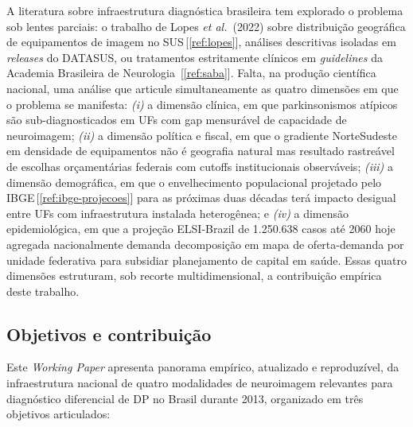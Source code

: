 \documentclass[12pt,a4paper,oneside]{article}
\begin{document}
A literatura sobre infraestrutura diagnóstica brasileira tem
explorado o problema sob lentes parciais: o trabalho de Lopes
\textit{et al.}\ (2022) sobre distribuição geográfica de
equipamentos de imagem no SUS\,[\ref{ref:lopes}], análises
descritivas isoladas em \textit{releases} do DATASUS, ou
tratamentos estritamente clínicos em
\textit{guidelines} da Academia Brasileira de Neurologia
\,[\ref{ref:saba}]. Falta, na produção científica nacional, uma
análise que articule simultaneamente as quatro dimensões em que o
problema se manifesta: \textit{(i)} a dimensão clínica, em que
parkinsonismos atípicos são sub-diagnosticados em UFs com gap
mensurável de capacidade de neuroimagem; \textit{(ii)} a dimensão
política e fiscal, em que o gradiente Norte\textendash Sudeste em
densidade de equipamentos não é geografia natural mas resultado
rastreável de escolhas orçamentárias federais com cutoffs
institucionais observáveis; \textit{(iii)} a dimensão demográfica,
em que o envelhecimento populacional projetado pelo
IBGE\,[\ref{ref:ibge-projecoes}] para as próximas duas décadas
terá impacto desigual entre UFs com infraestrutura instalada
heterogênea; e \textit{(iv)} a dimensão
epidemiológica, em que a projeção ELSI-Brazil de 1.250.638 casos
até 2060 \textemdash{} hoje agregada nacionalmente \textemdash{}
demanda decomposição em mapa de oferta-demanda por unidade
federativa para subsidiar planejamento de capital em saúde. Essas
quatro dimensões estruturam, sob recorte multidimensional, a
contribuição empírica deste trabalho.

\subsection{Objetivos e contribuição}

Este \textit{Working Paper} apresenta panorama empírico, atualizado e
reproduzível, da infraestrutura nacional de quatro modalidades de
neuroimagem relevantes para diagnóstico diferencial de DP no Brasil
durante 2013, organizado em três objetivos
articulados:
\end{document}

